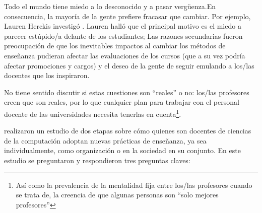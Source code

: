 
Todo el mundo tiene miedo a lo desconocido y a pasar vergüenza.En consecuencia,
la mayoría de la gente prefiere fracasar que cambiar.
Por ejemplo,
Lauren Herckis investigó 
.
Lauren halló que el principal motivo es el miedo a parecer estúpido/a delante de  los estudiantes; 
Las razones secundarias fueron
preocupación de que los inevitables impactos al cambiar los métodos de enseñanza pudieran afectar las evaluaciones de los cursos (que  a su vez podría afectar promociones y cargos) 
y el deseo de la gente de seguir emulando a los/las docentes que los inspiraron. 

No tiene sentido discutir si estas cuestiones son “reales” o no:
los/las profesores creen que son reales,
por lo que cualquier plan para trabajar con el personal docente de las universidades necesita tenerlas en cuenta\footnote{
Así como la prevalencia de la mentalidad fija entre los/las profesores cuando se trata de, la creencia de que algunas personas son “solo mejores profesores” }.

\cite{Bark2015} realizaron un estudio de dos etapas sobre cómo quienes son docentes de ciencias de la computación adoptan nuevas prácticas de enseñanza, ya sea individualmente, como organización o en la sociedad en su conjunto. En este estudio se preguntaron y respondieron tres preguntas claves:

